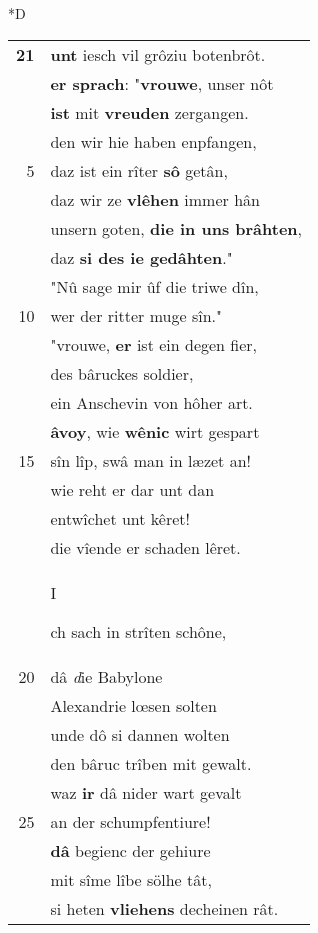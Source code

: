 \documentclass[8pt,a4paper,notitlepage]{article}
\begin{document}
\begin{table}[ht]
\begin{minipage}[t]{0.5\linewidth}
\small
\begin{center}*D
\end{center}
\begin{tabular}{rl}
\textbf{21} & \textbf{unt} iesch vil grôziu botenbrôt.\\ 
 & \textbf{er sprach}: "\textbf{vrouwe}, unser nôt\\ 
 & \textbf{ist} mit \textbf{vreuden} zergangen.\\ 
 & den wir hie haben enpfangen,\\ 
5 & daz ist ein rîter \textbf{sô} getân,\\ 
 & daz wir ze \textbf{vlêhen} immer hân\\ 
 & unsern goten, \textbf{die in uns brâhten},\\ 
 & daz \textbf{si des ie gedâhten}."\\ 
 & "Nû sage mir ûf die triwe dîn,\\ 
10 & wer der ritter muge sîn."\\ 
 & "vrouwe, \textbf{er} ist ein degen fier,\\ 
 & des bâruckes soldier,\\ 
 & ein Anschevin von hôher art.\\ 
 & \textbf{âvoy}, wie \textbf{wênic} wirt gespart\\ 
15 & sîn lîp, swâ man in læzet an!\\ 
 & wie reht er dar unt dan\\ 
 & entwîchet unt kêret!\\ 
 & die vîende er schaden lêret.\\ 
 & \begin{large}I\end{large}ch sach in strîten schône,\\ 
20 & dâ \textit{d}ie Babylone\\ 
 & Alexandrie lœsen solten\\ 
 & unde dô si dannen wolten\\ 
 & den bâruc trîben mit gewalt.\\ 
 & waz \textbf{ir} dâ nider wart gevalt\\ 
25 & an der schumpfentiure!\\ 
 & \textbf{dâ} begienc der gehiure\\ 
 & mit sîme lîbe sölhe tât,\\ 
 & si heten \textbf{vliehens} decheinen rât.\\ 

\end{tabular}
\end{minipage}
\end{table}
\end{document}
